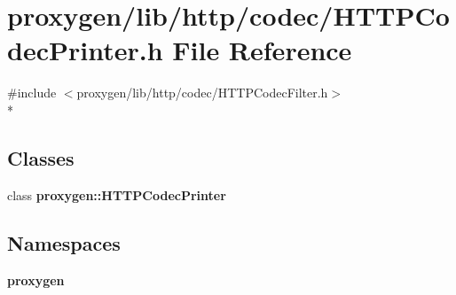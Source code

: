\section{proxygen/lib/http/codec/\+H\+T\+T\+P\+Codec\+Printer.h File Reference}
\label{HTTPCodecPrinter_8h}
{\ttfamily \#include $<$proxygen/lib/http/codec/\+H\+T\+T\+P\+Codec\+Filter.\+h$>$}\\*
\subsection*{Classes}
\begin{DoxyCompactItemize}
\item 
class {\bf proxygen\+::\+H\+T\+T\+P\+Codec\+Printer}
\end{DoxyCompactItemize}
\subsection*{Namespaces}
\begin{DoxyCompactItemize}
\item 
 {\bf proxygen}
\end{DoxyCompactItemize}
